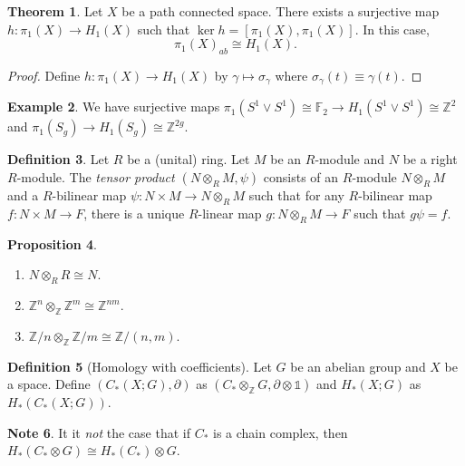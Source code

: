 \documentclass[10pt,letterpaper,cm]{nupset}
\theoremstyle{definition}
\newtheorem{definition}{Definition}[subsection]
\newtheorem{exmp}[definition]{Example}
\newtheorem{note}[definition]{Note}
\theoremstyle{theorem}
\newtheorem{theorem}[definition]{Theorem}
\newtheorem{prop}[definition]{Proposition}
\theoremstyle{remark}
\newcommand{\F}{\mathbb F}
\newcommand{\Z}{\mathbb Z}
\newcommand{\1}{\mathbb{1}}
\newcommand{\0}{\vec 0}
\begin{document}
\begin{theorem}
Let $X$ be a path connected space. There exists a surjective map $h: \pi_1(X) \to H_1(X)$ such that $\ker{h} = \left[\pi_1(X), \pi_1(X)\right]$. In this case, $$\pi_1(X)_{ab} \cong H_1(X).$$
\end{theorem}
\begin{proof}
Define $h: \pi_1(X) \to H_1(X)$ by $\gamma \mapsto \sigma_{\gamma}$ where $\sigma_{\gamma}(t) \equiv \gamma(t)$.  
\end{proof}

\begin{exmp}
We have surjective maps $\pi_1(S^1 \vee S^1) \cong \F_2 \to H_1(S^1 \vee S^1) \cong \Z^2$ and $\pi_1(S_g) \to H_1(S_g) \cong \Z^{2g}$.
\end{exmp}

\medskip


\begin{definition}
Let $R$ be a (unital) ring. Let $M$ be an $R$-module and $N$ be a right $R$-module. The \textit{tensor product $\left(N \otimes_R M, \psi\right)$} consists of an $R$-module $N \otimes_R M$ and a $R$-bilinear map $\psi : N \times M \to N \otimes_R M$ such that for any $R$-bilinear map $f: N \times M \to F$, there is a unique $R$-linear map $g : N \otimes_R M \to F$ such that $g{\psi} = f$.
\end{definition}

\begin{prop} $ $
\begin{enumerate}
\item $N \otimes_R R \cong N$.
\item $\Z^n \otimes_{\Z} \Z^m \cong \Z^{nm}$.
\item $\Z/n \otimes_{\Z} \Z/m \cong \Z/ (n,m)$.
\end{enumerate}
\end{prop}

\begin{definition}[Homology with coefficients]
Let $G$ be an abelian group and $X$ be a space.  Define $\left(C_{\ast}(X; G), \partial\right)$ as $\left(C_{\ast} \otimes_{\Z} G, \partial \otimes \1\right) $ and $H_{\ast}(X;G)$ as $H_{\ast}(C_{\ast}(X;G))$.
\end{definition}

\begin{note}
It it \textit{not} the case that if $C_{\ast}$ is a chain complex, then $H_{\ast}(C_{\ast} \otimes G) \cong H_{\ast}(C_{\ast}) \otimes G$.
\end{note}
\end{document}
